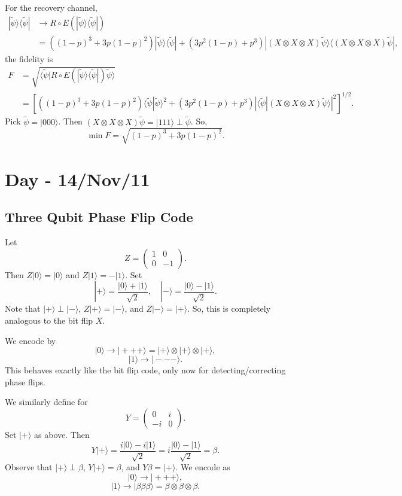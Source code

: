 \documentclass[12pt]{article}
\theoremstyle{definition}
\begin{document}
For the recovery channel,
\begin{align*}
|\widetilde{\psi}\rangle\langle \widetilde{\psi}| &\to R \circ E(|\widetilde{\psi}\rangle\langle \widetilde{\psi}|) \\
&= ((1-p)^3+3p(1-p)^2)|\widetilde{\psi}\rangle\langle \widetilde{\psi}| + (3p^2(1-p)+p^3)|(X\otimes X\otimes X)\widetilde{\psi}\rangle\langle (X\otimes X\otimes X)\widetilde{\psi}|,
\end{align*}
the fidelity is
\begin{align*}
F &= \sqrt{\langle \widetilde{\psi}|R \circ E(|\widetilde{\psi}\rangle\langle \widetilde{\psi}|)\widetilde{\psi}\rangle} \\
&= \left[((1-p)^3+3p(1-p)^2)\langle \widetilde{\psi}|\widetilde{\psi}\rangle^2 + (3p^2(1-p)+p^3)|\langle \widetilde{\psi}|(X\otimes X\otimes X)\widetilde{\psi}\rangle|^2\right]^{1/2}.
\end{align*}
Pick $\widetilde{\psi}=|000\rangle$. Then $(X\otimes X\otimes X)\widetilde{\psi}=|111\rangle \perp \widetilde{\psi}$. So,
\[
\min F = \sqrt{(1-p)^3+3p(1-p)^2}.
\]
\section{Day - 14/Nov/11}

\subsection{Three Qubit Phase Flip Code}

Let
\[
Z=\begin{pmatrix}1 & 0\\ 0 & -1\end{pmatrix}.
\]
Then $Z|0\rangle=|0\rangle$ and $Z|1\rangle=-|1\rangle$. Set
\[
|+\rangle = \frac{|0\rangle+|1\rangle}{\sqrt{2}}, \quad | - \rangle = \frac{|0\rangle-|1\rangle}{\sqrt{2}}.
\]
Note that $|+\rangle \perp |-\rangle$, $Z|+\rangle=|-\rangle$, and $Z|-\rangle=|+\rangle$. So, this is completely analogous to the bit flip $X$.

We encode by
\[
|0\rangle \to | + ++\rangle = |+\rangle \otimes |+\rangle \otimes |+\rangle,
\]
\[
|1\rangle \to |---\rangle.
\]
This behaves exactly like the bit flip code, only now for detecting/correcting phase flips.

We similarly define for
\[
Y=\begin{pmatrix}0 & i\\ -i & 0\end{pmatrix}.
\]
Set $|+\rangle$ as above. Then
\[
Y|+\rangle = \frac{i|0\rangle-i|1\rangle}{\sqrt{2}} = i\frac{|0\rangle-|1\rangle}{\sqrt{2}} = \beta.
\]
Observe that $|+\rangle \perp \beta$, $Y|+\rangle=\beta$, and $Y\beta=|+\rangle$. We encode as
\[
|0\rangle \to | + ++\rangle,
\]
\[
|1\rangle \to |\beta\beta\beta\rangle = \beta \otimes \beta \otimes \beta.
\]
\end{document}
